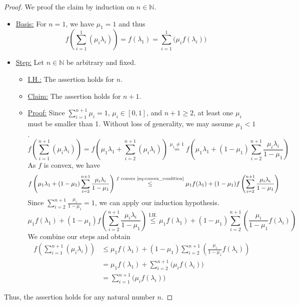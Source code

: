 \begin{proof}
We proof the claim by induction on $n\in\mathbb{N}$.
\begin{itemize}
\item\underline{Basis:} For $n=1$, we have $\mu_1=1$ and thus
\begin{equation*}
	f\left(\sum\limits_{i=1}^1(\mu_i\lambda_i)\right)=f(\lambda_1)=\sum\limits_{i=1}^1\bigl(\mu_if(\lambda_i)\bigr)
\end{equation*}
\item\underline{Step:} Let $n\in\mathbb{N}$ be arbitrary and fixed.
\begin{itemize}
	\item\underline{I.H.:} The assertion holds for $n$.
	\item\underline{Claim:} The assertion holds for $n+1$.
	\item\underline{Proof:} Since $\sum\limits_{i=1}^{n+1}\mu_i=1$, $\mu_i\in[0,1]$, and $n+1\ge 2$, at least one $\mu_i$ must be smaller than 1. Without loss of generality, we may assume $\mu_1<1$.
	\begin{equation*}
		f\left(\sum\limits_{i=1}^{n+1}(\mu_i\lambda_i)\right)=f\left(\mu_1\lambda_1+\sum\limits_{i=2}^{n+1}(\mu_i\lambda_i)\right)\stackrel{\mu_1\neq1}{=}f\left(\mu_1\lambda_1+(1-\mu_1)\sum\limits_{i=2}^{n+1}\frac{\mu_i\lambda_i}{1-\mu_1}\right)
	\end{equation*}
	As $f$ is convex, we have
	\begin{equation*}
		f\left(\mu_1\lambda_1+(1-\mu_1)\sum\limits_{i=2}^{n+1}\frac{\mu_i\lambda_i}{1-\mu_1}\right)\stackrel{f\text{ convex~\eqref{eq:convex_condition}}}{\le} \mu_1f(\lambda_1)+(1-\mu_1)f\left(\sum\limits_{i=2}^{n+1}\frac{\mu_i\lambda_i}{1-\mu_1}\right)
	\end{equation*}
	Since $\sum\limits_{i=2}^{n+1}\frac{\mu_i}{1-\mu_1}=1$, we can apply our induction hypothesis.
	\begin{equation*}
		\mu_1f(\lambda_1)+(1-\mu_1)f\left(\sum\limits_{i=2}^{n+1}\frac{\mu_i\lambda_i}{1-\mu_1}\right)\stackrel{\text{I.H.}}{\le} \mu_1f(\lambda_1)+(1-\mu_1)\sum\limits_{i=2}^{n+1}\left(\frac{\mu_i}{1-\mu_1}f(\lambda_i)\right)
	\end{equation*}
	We combine our steps and obtain
	\begin{align*}
		f\left(\sum\limits_{i=1}^{n+1}(\mu_i\lambda_i)\right)&\le \mu_1f(\lambda_1)+(1-\mu_1)\sum\limits_{i=2}^{n+1}\left(\frac{\mu_i}{1-\mu_1}f(\lambda_i)\right)\\
		&=\mu_1f(\lambda_1)+\sum\limits_{i=2}^{n+1}\bigl(\mu_if(\lambda_i)\bigr)\\
		&=\sum_{i=1}^{n+1}\bigl(\mu_i f(\lambda_i)\bigr)
	\end{align*}
\end{itemize}
\end{itemize}
Thus, the assertion holds for any natural number $n$.
\end{proof}
